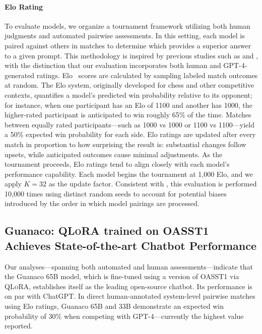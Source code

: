 \paragraph{Elo Rating} To evaluate models, we organize a tournament framework utilizing both human judgments and automated pairwise assessments. In this setting, each model is paired against others in matches to determine which provides a superior answer to a given prompt. This methodology is inspired by previous studies such as \citet{bai2022training} and \citet{vicuna2023}, with the distinction that our evaluation incorporates both human and GPT-4-generated ratings. Elo~\citep{elo1967proposed,elo1978rating} scores are calculated by sampling labeled match outcomes at random. The Elo system, originally developed for chess and other competitive contexts, quantifies a model's predicted win probability relative to its opponent; for instance, when one participant has an Elo of 1100 and another has 1000, the higher-rated participant is anticipated to win roughly 65\% of the time. Matches between equally rated participants—such as 1000 vs 1000 or 1100 vs 1100—yield a 50\% expected win probability for each side. Elo ratings are updated after every match in proportion to how surprising the result is: substantial changes follow upsets, while anticipated outcomes cause minimal adjustments. As the tournament proceeds, Elo ratings tend to align closely with each model's performance capability. Each model begins the tournament at 1,000 Elo, and we apply $K=32$ as the update factor. Consistent with \citet{vicuna2023}, this evaluation is performed 10,000 times using distinct random seeds to account for potential biases introduced by the order in which model pairings are processed.

\subsection{\textbf{Guanaco}: \textsc{QLoRA} trained on OASST1 Achieves State-of-the-art Chatbot Performance} 

Our analyses—spanning both automated and human assessments—indicate that the {Guanaco} 65B model, which is fine-tuned using a version of OASST1 via \textsc{QLoRA}, establishes itself as the leading open-source chatbot. Its performance is on par with ChatGPT. In direct human-annotated system-level pairwise matches using Elo ratings, {Guanaco} 65B and 33B demonstrate an expected win probability of 30\% when competing with GPT-4—currently the highest value reported.

